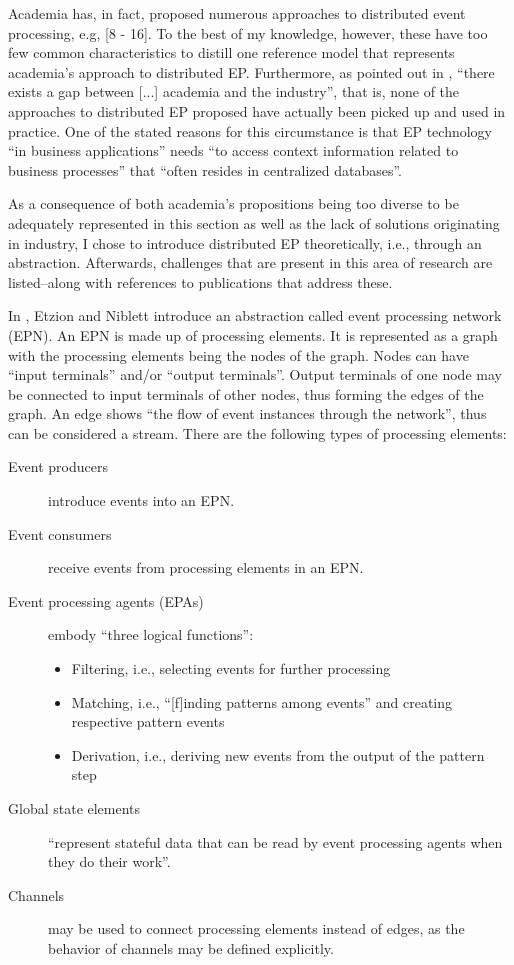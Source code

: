 \documentclass[article, type=bsc, colorback, accentcolor=tud8b, parskip=half, bibliography=totocnumbered]{tudthesis}
\begin{document}
Academia has, in fact, proposed numerous approaches to distributed event processing, e.g, [8 - 16].
To the best of my knowledge, however, these have too few common characteristics to distill one reference model that represents academia's approach to distributed EP.
Furthermore, as pointed out in \cite{Schilling:2010:DHE:1827418.1827453}, ``there exists a gap between [...] academia and the industry'', that is, none of the approaches to distributed EP proposed have actually been picked up and used in practice.
One of the stated reasons for this circumstance is that EP technology ``in business applications'' needs ``to access context information related to business processes'' that ``often resides in centralized databases''.

As a consequence of both academia's propositions being too diverse to be adequately represented in this section as well as the lack of solutions originating in industry, I chose to introduce distributed EP theoretically, i.e., through an abstraction.
Afterwards, challenges that are present in this area of research are listed--along with references to publications that address these.

In \cite{Etzion:2010:EPA:1894960}, Etzion and Niblett introduce an abstraction called event processing network (EPN).
An EPN is made up of processing elements.
It is represented as a graph with the processing elements being the nodes of the graph.
Nodes can have ``input terminals'' and/or ``output terminals''.
Output terminals of one node may be connected to input terminals of other nodes, thus forming the edges of the graph.
An edge shows ``the flow of event instances through the network'', thus can be considered a stream.
There are the following types of processing elements:

\begin{description}

\item[Event producers]
introduce events into an EPN.
\item[Event consumers]
receive events from processing elements in an EPN.
\item[Event processing agents (EPAs)]
embody ``three logical functions'':

\begin{itemize}

\item
Filtering, i.e., selecting events for further processing
\item
Matching, i.e., ``[f]inding patterns among events'' and creating respective pattern events
\item
Derivation, i.e., deriving new events from the output of the pattern step

\end{itemize}

\item[Global state elements]
``represent stateful data that can be read by event processing agents when they do their work''.
\item[Channels]
may be used to connect processing elements instead of edges, as the behavior of channels may be defined explicitly.

\end{description}
\end{document}
